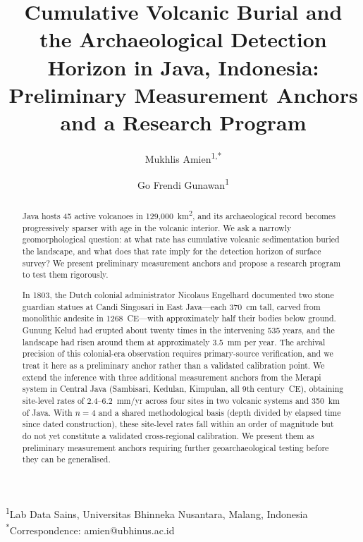 \documentclass[12pt,a4paper]{article}
\begin{document}
\title{Cumulative Volcanic Burial and the Archaeological Detection Horizon in Java, Indonesia: Preliminary Measurement Anchors and a Research Program}

\author{Mukhlis Amien\textsuperscript{1,*} \and Go Frendi Gunawan\textsuperscript{1}}

\date{}

\maketitle

\noindent\textsuperscript{1}Lab Data Sains, Universitas Bhinneka Nusantara, Malang, Indonesia\\
\textsuperscript{*}Correspondence: amien@ubhinus.ac.id

\begin{abstract}
Java hosts 45 active volcanoes in 129,000~km\textsuperscript{2}, and its archaeological record becomes progressively sparser with age in the volcanic interior. We ask a narrowly geomorphological question: at what rate has cumulative volcanic sedimentation buried the landscape, and what does that rate imply for the detection horizon of surface survey? We present preliminary measurement anchors and propose a research program to test them rigorously.

In 1803, the Dutch colonial administrator Nicolaus Engelhard documented two stone guardian statues at Candi Singosari in East Java---each 370~cm tall, carved from monolithic andesite in 1268~CE---with approximately half their bodies below ground. Gunung Kelud had erupted about twenty times in the intervening 535 years, and the landscape had risen around them at approximately 3.5~mm per year. The archival precision of this colonial-era observation requires primary-source verification, and we treat it here as a preliminary anchor rather than a validated calibration point. We extend the inference with three additional measurement anchors from the Merapi system in Central Java (Sambisari, Kedulan, Kimpulan, all 9th century~CE), obtaining site-level rates of 2.4--6.2~mm/yr across four sites in two volcanic systems and 350~km of Java. With $n=4$ and a shared methodological basis (depth divided by elapsed time since dated construction), these site-level rates fall within an order of magnitude but do not yet constitute a validated cross-regional calibration. We present them as preliminary measurement anchors requiring further geoarchaeological testing before they can be generalised.


\end{abstract}
\end{document}
